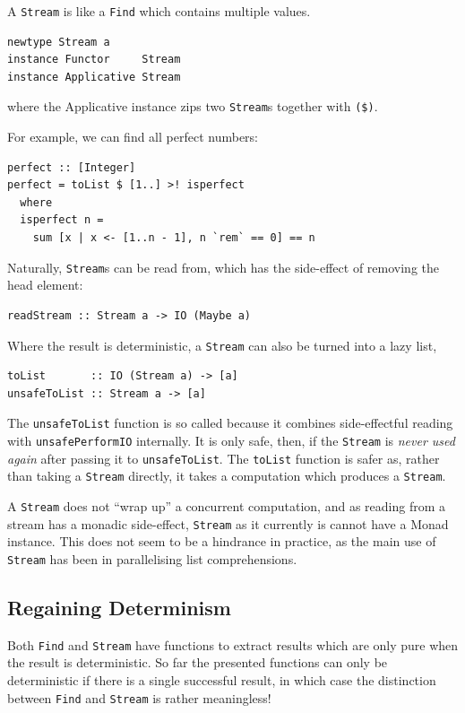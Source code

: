 A \verb|Stream| is like a \verb|Find| which contains multiple
values.

\begin{verbatim}
newtype Stream a
instance Functor     Stream
instance Applicative Stream
\end{verbatim}

\noindent where the Applicative instance zips two \verb|Stream|s
together with \verb|($)|.

For example, we can find all perfect numbers:

\begin{verbatim}
perfect :: [Integer]
perfect = toList $ [1..] >! isperfect
  where
  isperfect n =
    sum [x | x <- [1..n - 1], n `rem` == 0] == n
\end{verbatim}

Naturally, \verb|Stream|s can be read from, which has the side-effect
of removing the head element:

\begin{verbatim}
readStream :: Stream a -> IO (Maybe a)
\end{verbatim}

Where the result is deterministic, a \verb|Stream| can also be turned
into a lazy list,

\begin{verbatim}
toList       :: IO (Stream a) -> [a]
unsafeToList :: Stream a -> [a]
\end{verbatim}

The \verb|unsafeToList| function is so called because it combines
side-effectful reading with \verb|unsafePerformIO| internally. It is
only safe, then, if the \verb|Stream| is \textit{never used again}
after passing it to \verb|unsafeToList|. The \verb|toList| function is
safer as, rather than taking a \verb|Stream| directly, it takes a
computation which produces a \verb|Stream|.

A \verb|Stream| does not ``wrap up'' a concurrent computation, and as
reading from a stream has a monadic side-effect, \verb|Stream| as it
currently is cannot have a Monad instance. This does not seem to be a
hindrance in practice, as the main use of \verb|Stream| has been in
parallelising list comprehensions.

\subsection{Regaining Determinism}
\label{sec:searchparty-api-det}

Both \verb|Find| and \verb|Stream| have functions to extract results
which are only pure when the result is deterministic. So far the
presented functions can only be deterministic if there is a single
successful result, in which case the distinction between \verb|Find|
and \verb|Stream| is rather meaningless!

